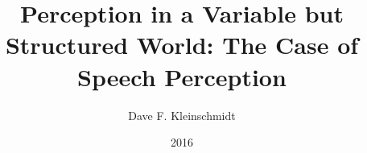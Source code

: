 \documentclass[12pt]{report}
\begin{document}
\title{Perception in a Variable but Structured World: The Case of Speech Perception}
\author{Dave F. Kleinschmidt}
\date{2016}
\maketitle











\tableofcontents
\listoftables
\listoffigures





\graphicspath{{chapters/02_ideal_adapter/}}


\graphicspath{{chapters/03_selective_adaptation/}}


\graphicspath{{chapters/04_infer_prior/}}


\graphicspath{{chapters/05_talker_variation/}}




\printbibliography[heading=bibintoc,title={References}]

\appendix

\graphicspath{{chapters/02_ideal_adapter/}}

\end{document}
